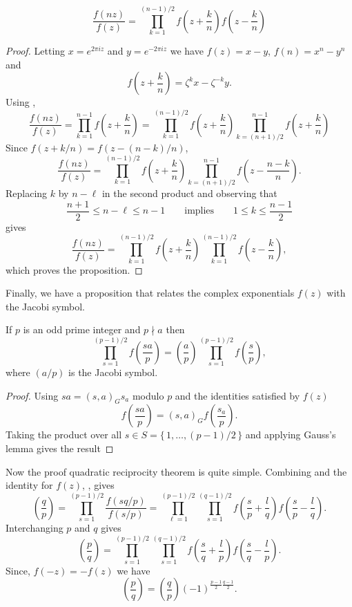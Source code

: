 \begin{proposition} \label{QR:Help:b:Prop}
\[
\frac{f(nz)}{f(z)} = 
  \prod_{k=1}^{(n-1)/2} 
     f\left(z + \frac{k}{n}\right) f\left(z - \frac{k}{n}\right)
\]
\end{proposition}

\begin{proof}
Letting $x = e^{2 \pi i z}$ and $y = e^{-2 \pi i z}$ we have $f(z) = x
- y$, $f(n) = x^n - y^n$ and 
\[
f(z + \frac{k}{n}) = \zeta^k x - \zeta^{-k} y.
\]
Using , 
\[
\frac{f(nz)}{f(z)} =
 \prod_{k=1}^{n-1} f\left( z + \frac{k}{n}\right) = 
 \prod_{k=1}^{(n-1)/2} f\left( z + \frac{k}{n}\right) 
 \prod_{k=(n+1)/2}^{n-1} f\left( z + \frac{k}{n}\right)
\]
Since $f(z +k/n) = f(z - (n-k)/n)$,
\[
\frac{f(nz)}{f(z)}  =
 \prod_{k=1}^{(n-1)/2} f\left( z + \frac{k}{n}\right)
 \prod_{k=(n+1)/2}^{n-1} f\left( z - \frac{n-k}{n}\right).
\]
Replacing $k$ by $n - \ell$ in the second product and observing that 
\[
\frac{n+1}{2} \le n - \ell \le n - 1
\qquad\mbox{implies}\qquad
1 \le k \le \frac{n-1}{2}
\]
gives
\[
\frac{f(nz)}{f(z)}  =
 \prod_{k=1}^{(n-1)/2} f\left( z + \frac{k}{n}\right)
 \prod_{k=1}^{(n-1)/2} f\left( z - \frac{k}{n}\right),
\]
which proves the proposition.
\end{proof}

Finally, we have a proposition that relates the complex exponentials
$f(z)$ with the Jacobi symbol.

\begin{proposition}\label{QR:Help:c:Prop}
If $p$ is an odd prime integer and $p \nmid a$ then 
\[
\prod_{s=1}^{(p-1)/2} f\left(\frac{sa}{p}\right) = 
\left(\frac{a}{p}\right) 
  \prod_{s=1}^{(p-1)/2} f\left(\frac{s}{p}\right),
\]
where $(a/p)$ is the Jacobi symbol.
\end{proposition}

\begin{proof}
Using $sa = (s, a)_G s_a$ modulo $p$ and the identities satisfied by
$f(z)$
\[
f\left(\frac{sa}{p}\right) = (s, a)_G f\left(\frac{s_a}{p}\right).
\]
Taking the product over all $s \in S = \{\, 1, \ldots, (p-1)/2\,\}$
and applying Gauss's lemma gives the result
\end{proof}

Now the proof quadratic reciprocity theorem is quite simple.
Combining  and the identity for $f(z)$,
, gives 
\[
\left(\frac{q}{p}\right) = 
\prod_{s=1}^{(p-1)/2} \frac{f(sq/p)}{f(s/p)} = 
\prod_{\ell=1}^{(p-1)/2} \prod_{s=1}^{(q-1)/2}
  f\left(\frac{s}{p} + \frac{l}{q}\right) 
  f\left(\frac{s}{p} - \frac{l}{q}\right).
\]
Interchanging $p$ and $q$ gives
\[
\left(\frac{p}{q}\right) = 
\prod_{s=1}^{(p-1)/2} \prod_{s=1}^{(q-1)/2}
  f\left(\frac{s}{q} + \frac{l}{p}\right) 
  f\left(\frac{s}{q} - \frac{l}{p}\right).
\]
Since, $f(-z) = - f(z)$ we have
\[
\left(\frac{p}{q}\right) 
= \left(\frac{q}{p}\right) (-1)^{\frac{p-1}{2} \frac{q-1}{2}}.
\]

